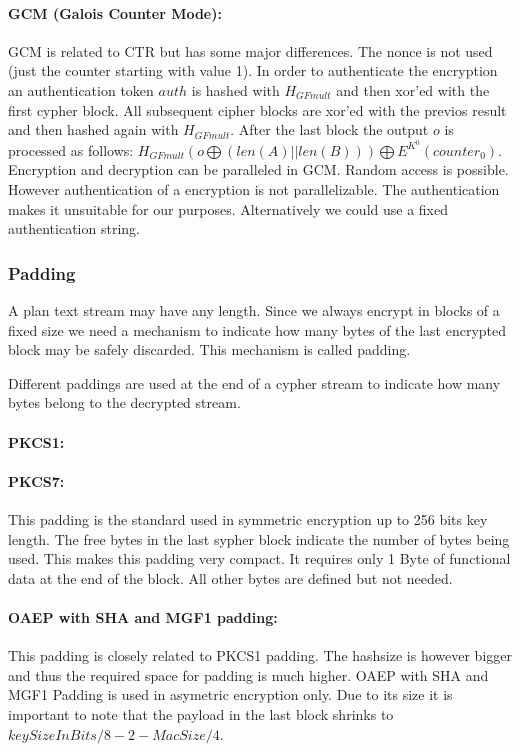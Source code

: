 \paragraph{GCM (Galois Counter Mode):} GCM is related to CTR but has some major differences. The nonce  is not used (just the counter starting with value 1). In order to authenticate the encryption an authentication token $auth$ is hashed with $H_{GFmult}$ and then xor'ed with the first cypher block. All subsequent cipher blocks are xor'ed with the previos result and then hashed  again with $H_{GFmult}$. After the last block the output $o$ is processed  as follows: $H_{GFmult}(o\bigoplus (len(A)||len(B))) \bigoplus E^{K^0}(counter_0)$. Encryption and decryption can be paralleled in GCM. Random access is possible. However authentication of a encryption is not parallelizable. The authentication makes it unsuitable for our purposes. Alternatively we could use a fixed authentication string.

\subsubsection{Padding}
A plan text stream may have any length. Since we always encrypt in blocks of a fixed size we need a mechanism to indicate how many bytes of the last encrypted block may be safely discarded. This mechanism is called padding. 

Different paddings are used at the end of a cypher stream to indicate how many bytes belong to the decrypted stream.
\paragraph{PKCS1:}  

\paragraph{PKCS7:} This padding is the standard used in symmetric encryption up to 256 bits key length. The free bytes in the last sypher block indicate the number of bytes being used. This makes this padding very compact. It requires only 1 Byte of functional data at the end of the block. All other bytes are defined but not needed.

\paragraph{OAEP with SHA and MGF1 padding:} This padding is closely related to PKCS1 padding. The hashsize is however bigger and thus the required space for padding is much higher. OAEP with SHA and MGF1 Padding is used in asymetric encryption only. Due to its size it is important to note that the payload in the last block shrinks to $keySizeInBits/8-2-MacSize/4$.

